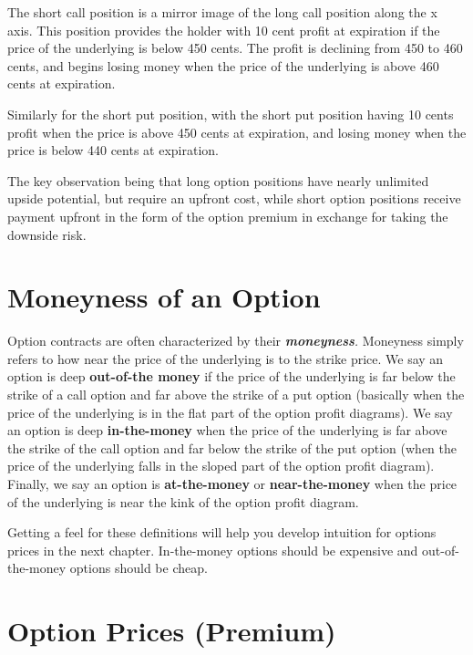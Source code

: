 \documentclass[
  letterpaper,
  DIV=11,
  numbers=noendperiod]{scrreprt}
\begin{document}
The short call position is a mirror image of the long call position
along the x axis. This position provides the holder with 10 cent profit
at expiration if the price of the underlying is below 450 cents. The
profit is declining from 450 to 460 cents, and begins losing money when
the price of the underlying is above 460 cents at expiration.

Similarly for the short put position, with the short put position having
10 cents profit when the price is above 450 cents at expiration, and
losing money when the price is below 440 cents at expiration.

The key observation being that long option positions have nearly
unlimited upside potential, but require an upfront cost, while short
option positions receive payment upfront in the form of the option
premium in exchange for taking the downside risk.

\hypertarget{moneyness-of-an-option}{%
\section{Moneyness of an Option}\label{moneyness-of-an-option}}

Option contracts are often characterized by their
\emph{\textbf{moneyness}.} Moneyness simply refers to how near the price
of the underlying is to the strike price. We say an option is deep
\textbf{out-of-the money} if the price of the underlying is far below
the strike of a call option and far above the strike of a put option
(basically when the price of the underlying is in the flat part of the
option profit diagrams). We say an option is deep \textbf{in-the-money}
when the price of the underlying is far above the strike of the call
option and far below the strike of the put option (when the price of the
underlying falls in the sloped part of the option profit diagram).
Finally, we say an option is \textbf{at-the-money} or
\textbf{near-the-money} when the price of the underlying is near the
kink of the option profit diagram.

Getting a feel for these definitions will help you develop intuition for
options prices in the next chapter. In-the-money options should be
expensive and out-of-the-money options should be cheap.

\hypertarget{option-prices-premium}{%
\section{Option Prices (Premium)}\label{option-prices-premium}}
\end{document}
